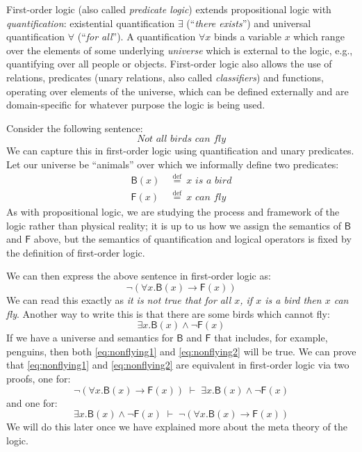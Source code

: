 \renewcommand{\highlight}[1]{%
  \colorbox{yellow!50}{$\displaystyle#1$}}
\newcommand{\highlightG}[1]{%
  \colorbox{green!30}{$\displaystyle#1$}}
\newcommand{\highlightR}[1]{%
  \colorbox{red!20}{$\displaystyle#1$}}

\newcommand{\rel}[1]{\mathsf{#1}}


First-order logic (also called \emph{predicate logic}) extends
propositional logic with \emph{quantification}: existential quantification
$\exists$ (``\emph{there exists}'') and universal quantification
$\forall$ (``\emph{for all}''). A quantification $\forall x$
binds a variable $x$ which range over the elements of some underlying
\emph{universe} which is external to the logic, e.g., quantifying
over all people or objects.  First-order logic also
allows the use of relations, predicates (unary relations, also called
\emph{classifiers}) and functions, operating
over elements of the universe, which can
be defined externally and are
domain-specific for whatever purpose the logic is being used.

Consider the following sentence:
%
\begin{equation*}
  \textit{Not all birds can fly}
\end{equation*}
%
We can capture this in first-order logic using quantification and
unary predicates. Let our universe be ``animals''
over which we informally define two predicates:
%
\begin{align*}
  \rel{B}(x)\ & \stackrel{\text{def}}{=}\ \textit{$x$ is a bird} \\
  \rel{F}(x)\ & \stackrel{\text{def}}{=}\ \textit{$x$ can fly}
\end{align*}
%
As with propositional logic, we are studying the process and framework
of the logic rather than physical reality; it is up to us how we
assign the semantics of $\rel{B}$ and $\rel{F}$ above, but the
semantics of quantification and logical operators is fixed by the
definition of first-order logic.

We can then express the above sentence in first-order logic as:
%
\begin{equation}
  \neg (\forall x . \rel{B}(x) \rightarrow \rel{F}(x))
  \label{eq:nonflying1}
\end{equation}
%
We can read this exactly as \emph{it is not true that for all $x$, if
  $x$ is a bird then $x$ can fly}. Another way to write this is
that there are some birds which cannot fly:
%
\begin{equation}
  \exists x . \rel{B}(x) \wedge \neg \rel{F}(x)
    \label{eq:nonflying2}
\end{equation}
%
If we have a universe and semantics for $\rel{B}$ and $\rel{F}$ that includes, for
example, penguins, then both \eqref{eq:nonflying1} and
\eqref{eq:nonflying2} will be true.
We can prove that \eqref{eq:nonflying1} and
\eqref{eq:nonflying2} are equivalent in first-order logic via two
proofs, one for:
$$\neg (\forall x . \rel{B}(x) \rightarrow \rel{F}(x)) \; \vdash \;
\exists x . \rel{B}(x) \wedge \neg \rel{F}(x)$$
and one for:
$$
\exists x . \rel{B}(x) \wedge \neg \rel{F}(x) \; \vdash \;
\neg (\forall x . \rel{B}(x) \rightarrow \rel{F}(x))
$$
We will do this later once we have explained more about the
meta theory of the logic.

